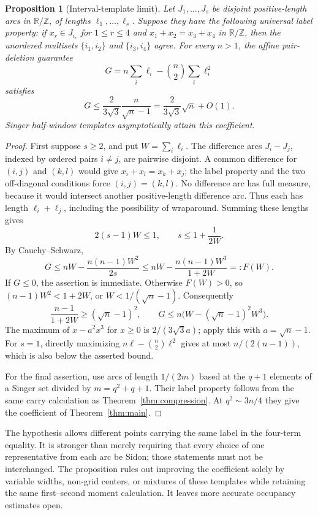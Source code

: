 \documentclass[11pt]{article}
\newtheorem{proposition}[theorem]{Proposition}
\theoremstyle{definition}
\theoremstyle{remark}
\newcommand{\T}{\mathbb R/\mathbb Z}
\begin{document}
\begin{proposition}[Interval-template limit]\label{prop:template-limit}
Let $J_1,\ldots,J_s$ be disjoint positive-length arcs in $\T$, of
lengths $\ell_1,\ldots,\ell_s$. Suppose they have the following
universal label property: if $x_r\in J_{i_r}$ for $1\le r\le4$ and
$x_1+x_2=x_3+x_4$ in $\T$, then the unordered multisets
$\{i_1,i_2\}$ and $\{i_3,i_4\}$ agree.
For every $n>1$, the affine pair-deletion guarantee
\[
G=n\sum_i\ell_i-\binom n2\sum_i\ell_i^2
\]
satisfies
\[
G\le\frac{2}{3\sqrt3}\frac{n}{\sqrt n-1}
=\frac{2}{3\sqrt3}\sqrt n+O(1).
\]
Singer half-window templates asymptotically attain this coefficient.
\end{proposition}
\begin{proof}
First suppose $s\ge2$, and put $W=\sum_i\ell_i$.
The difference arcs $J_i-J_j$, indexed by ordered pairs $i\ne j$,
are pairwise disjoint. A common difference for $(i,j)$ and $(k,l)$
would give $x_i+x_l=x_k+x_j$; the label property and the two
off-diagonal conditions force $(i,j)=(k,l)$.
No difference arc has full measure, because it would intersect another
positive-length difference arc. Thus each has length $\ell_i+\ell_j$,
including the possibility of wraparound. Summing these lengths gives
\[
2(s-1)W\le1,\qquad s\le1+\frac1{2W}.
\]
By Cauchy--Schwarz,
\[
G\le nW-\frac{n(n-1)W^2}{2s}
\le nW-\frac{n(n-1)W^3}{1+2W}=:F(W).
\]
If $G\le0$, the assertion is immediate. Otherwise $F(W)>0$, so
$(n-1)W^2<1+2W$, or $W<1/(\sqrt n-1)$. Consequently
\[
\frac{n-1}{1+2W}\ge(\sqrt n-1)^2,
\qquad
G\le n\bigl(W-(\sqrt n-1)^2W^3\bigr).
\]
The maximum of $x-a^2x^3$ for $x\ge0$ is $2/(3\sqrt3 a)$;
apply this with $a=\sqrt n-1$. For $s=1$, directly maximizing
$n\ell-\binom n2\ell^2$ gives at most $n/(2(n-1))$, which is
also below the asserted bound.

For the final assertion, use arcs of length $1/(2m)$ based at the
$q+1$ elements of a Singer set divided by $m=q^2+q+1$.
Their label property follows from the same carry calculation as
Theorem~\ref{thm:compression}. At $q^2\sim3n/4$ they give the
coefficient of Theorem~\ref{thm:main}.
\end{proof}

The hypothesis allows different points carrying the same label in the
four-term equality. It is stronger than merely requiring that every
choice of one representative from each arc be Sidon; those statements
must not be interchanged. The proposition rules out improving the
coefficient solely by variable widths, non-grid centers, or mixtures
of these templates while retaining the same first--second moment
calculation. It leaves more accurate occupancy estimates open.
\end{document}
